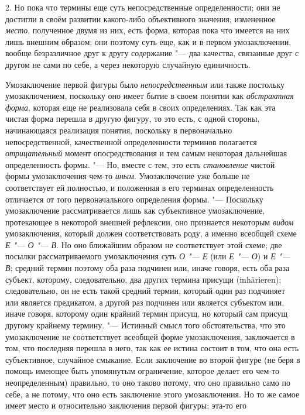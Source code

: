 2. Но пока что термины еще суть непосредственные
определенности; они не достигли в своём развитии какого-либо объективного
значения; измененное {\em место},
полученное двумя из них, есть форма, которая пока что имеется
на них лишь внешним образом; они поэтому суть еще, как и в
первом умозаключении, вообще безразличное друг к другу содержание
"--- два качества, связанные друг с другом не сами по себе, а
через некоторую случайную единичность.

Умозаключение первой фигуры было
{\em непосредственным}
или также постольку умозаключением, поскольку оно имеет бытие
в своем понятии как {\em абстрактная
форма}, которая еще не реализовала себя в своих
определениях. Так как эта чистая форма перешла в другую фигуру, то это
есть, с одной стороны, начинающаяся реализация понятия, поскольку в
первоначально непосредственной, качественной определенности терминов
полагается {\em отрицательный}
момент опосредствования и тем самым некоторая дальнейшая
определенность формы. "--- Но, вместе с тем, это есть
{\em становление} чистой
формы умозаключения чем-то {\em иным}.
Умозаключение уже больше не соответствует ей полностью, и
положенная в его терминах определенность отличается от того первоначального
определения формы. "--- Поскольку умозаключение рассматривается
лишь как субъективное умозаключение, протекающее в некоторой внешней
рефлексии, оно признается некоторым
{\em видом}
умозаключения, который должен соответствовать роду, а именно
всеобщей схеме {\em Е
"--- О "--- В}. Но оно ближайшим
образом не соответствует этой схеме; две посылки рассматриваемого
умозаключения суть {\em О
"--- Е} (или
{\em Е "--- О})
и {\em Е
"--- В}; средний термин поэтому оба раза подчинен
или, иначе говоря, есть оба раза субъект, которому, следовательно, два
других термина присущи (inhärieren); следовательно, он не
есть такой средний термин, который один раз подчиняет или является
предикатом, а другой раз подчинен или является субъектом или, иначе говоря,
которому один крайний термин присущ, но который сам присущ другому крайнему
термину. "--- Истинный смысл того обстоятельства, что это
умозаключение не соответствует всеобщей форме умозаключения, заключается в
том, что последняя перешла в него, так как ее истина состоит в том, что она
есть субъективное, случайное смыкание. Если заключение во второй фигуре (не
беря в помощь имеющее быть упомянутым ограничение, которое делает его
чем-то неопределенным) правильно, то оно таково потому, что оно правильно
само по себе, а не потому, что оно есть заключение этого умозаключения. Но
то же самое имеет место и относительно заключения первой фигуры; эта-то его
